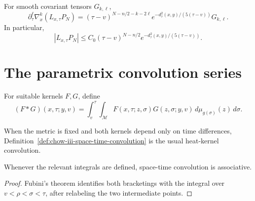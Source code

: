 \begin{lemma}
\label{lem:chow-iii-cutoff-parametrix-error-derivatives}
For smooth covariant tensors \(G_{k,\ell}\),
\[
 \partial_\tau^\ell\nabla_x^k(L_{x,\tau}P_N)
 =(\tau-v)^{N-n/2-k-2\ell}
 e^{-d_\tau^2(x,y)/(5(\tau-v))}G_{k,\ell}.
\]
In particular,
\[
 |L_{x,\tau}P_N|\le C_0(\tau-v)^{N-n/2}
 e^{-d_\tau^2(x,y)/(5(\tau-v))}.
\]
\end{lemma}

\section{The parametrix convolution series}

\begin{definition}
\label{def:chow-iii-space-time-convolution}
For suitable kernels \(F,G\), define
\[
 (F*G)(x,\tau;y,v)=\int_v^\tau\!\int_{\mathcal M}
 F(x,\tau;z,\sigma)G(z,\sigma;y,v)
 \,d\mu_{g(\sigma)}(z)\,d\sigma.
\]
\end{definition}

\begin{remark}
\label{rem:chow-iii-static-convolution}
When the metric is fixed and both kernels depend only on time differences,
Definition~\ref{def:chow-iii-space-time-convolution} is the usual heat-kernel
convolution.
\end{remark}

\begin{lemma}
\label{lem:chow-iii-space-time-convolution-associative}
Whenever the relevant integrals are defined, space-time convolution is
associative.
\end{lemma}
\begin{proof}
\sketch Fubini's theorem identifies both bracketings with the integral over
\(v<\rho<\sigma<\tau\), after relabeling the two intermediate points.
\end{proof}

